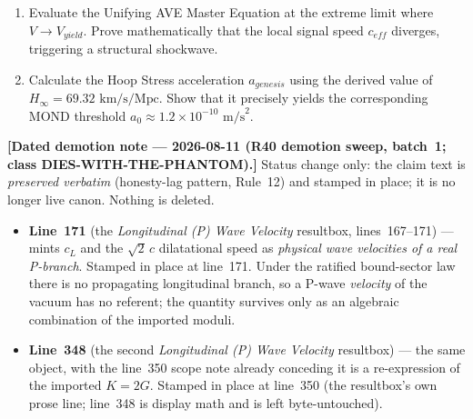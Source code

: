 \begin{exercisebox}
\begin{enumerate}
    \item Evaluate the Unifying AVE Master Equation at the extreme limit where $V \to V_{yield}$. Prove mathematically that the local signal speed $c_{eff}$ diverges, triggering a structural shockwave.
    \item Calculate the Hoop Stress acceleration $a_{genesis}$ using the derived value of $H_\infty = 69.32 \text{ km/s/Mpc}$. Show that it precisely yields the corresponding MOND threshold $a_0 \approx 1.2 \times 10^{-10} \text{ m/s}^2$. 
\end{enumerate}
\end{exercisebox}

\medskip
\noindent\textbf{[Dated demotion note --- 2026-08-11 (R40 demotion sweep, batch~1;
class DIES-WITH-THE-PHANTOM).]} Status change only: the claim text is \emph{preserved
verbatim} (honesty-lag pattern, Rule~12) and stamped in place; it is no longer live canon.
Nothing is deleted.

\begin{itemize}
  \item \textbf{Line~171} (the \emph{Longitudinal (P) Wave Velocity} resultbox, lines~167--171) --- mints $c_L$ and the $\sqrt2\,c$ dilatational speed as \emph{physical wave velocities of a real P-branch}. Stamped in place at line~171. Under the ratified bound-sector law there is no propagating longitudinal branch, so a P-wave \emph{velocity} of the vacuum has no referent; the quantity survives only as an algebraic combination of the imported moduli.
  \item \textbf{Line~348} (the second \emph{Longitudinal (P) Wave Velocity} resultbox) --- the same object, with the line~350 scope note already conceding it is a re-expression of the imported $K = 2G$. Stamped in place at line~350 (the resultbox's own prose line; line~348 is display math and is left byte-untouched).
\end{itemize}

